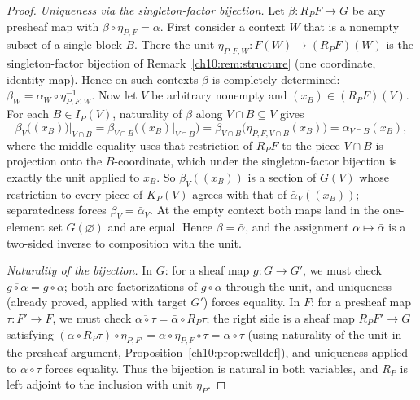 \begin{proof}
\emph{Uniqueness via the singleton-factor bijection.} Let
$\beta : R_P F \to G$ be any presheaf map with
$\beta \circ \eta_{P, F} = \alpha$. First consider a context $W$ that is a
nonempty subset of a single block $B$. There the unit
$\eta_{P, F, W} : F(W) \to (R_P F)(W)$ is the singleton-factor bijection of
Remark~\ref{ch10:rem:structure} (one coordinate, identity map). Hence on such
contexts $\beta$ is completely determined:
$\beta_W = \alpha_W \circ \eta_{P, F, W}^{-1}$. Now let $V$ be arbitrary
nonempty and $(x_B) \in (R_P F)(V)$. For each $B \in I_P(V)$, naturality of
$\beta$ along $V \cap B \subseteq V$ gives
\[
\beta_V\bigl((x_B)\bigr)\big|_{V \cap B}
= \beta_{V \cap B}\bigl( (x_B)|_{V \cap B} \bigr)
= \beta_{V \cap B}\bigl( \eta_{P, F, V \cap B}(x_B) \bigr)
= \alpha_{V \cap B}(x_B),
\]
where the middle equality uses that restriction of $R_P F$ to the piece
$V \cap B$ is projection onto the $B$-coordinate, which under the
singleton-factor bijection is exactly the unit applied to $x_B$. So
$\beta_V((x_B))$ is a section of $G(V)$ whose restriction to every piece of
$K_P(V)$ agrees with that of $\bar{\alpha}_V((x_B))$; separatedness forces
$\beta_V = \bar{\alpha}_V$. At the empty context both maps land in the
one-element set $G(\varnothing)$ and are equal. Hence $\beta = \bar{\alpha}$,
and the assignment $\alpha \mapsto \bar{\alpha}$ is a two-sided inverse to
composition with the unit.

\emph{Naturality of the bijection.} In $G$: for a sheaf map $g : G \to G'$,
we must check $\overline{g \circ \alpha} = g \circ \bar{\alpha}$; both are
factorizations of $g \circ \alpha$ through the unit, and uniqueness (already
proved, applied with target $G'$) forces equality. In $F$: for a presheaf map
$\tau : F' \to F$, we must check
$\overline{\alpha \circ \tau} = \bar{\alpha} \circ R_P \tau$; the right side
is a sheaf map $R_P F' \to G$ satisfying
$(\bar{\alpha} \circ R_P \tau) \circ \eta_{P, F'}
= \bar{\alpha} \circ \eta_{P, F} \circ \tau = \alpha \circ \tau$
(using naturality of the unit in the presheaf argument,
Proposition~\ref{ch10:prop:welldef}), and uniqueness applied to
$\alpha \circ \tau$ forces equality. Thus the bijection is natural in both
variables, and $R_P$ is left adjoint to the inclusion with unit $\eta_P$.
\end{proof}

